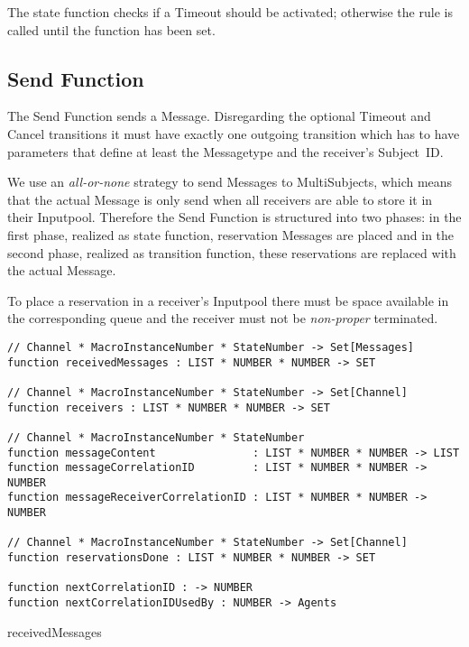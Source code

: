 The state function checks if a Timeout should be activated; otherwise the
 rule is called until the  function has
been set.




\subsection{Send Function}


The Send Function sends a Message. Disregarding the optional Timeout and Cancel
transitions it must have exactly one outgoing transition which has to have parameters that
define at least the Messagetype and the receiver's Subject~ID.

We use an \textit{all-or-none} strategy to send Messages to MultiSubjects,
which means that the actual Message is only send when all receivers are able
to store it in their Inputpool. Therefore the Send Function is structured into
two phases: in the first phase, realized as state function, reservation Messages
are placed and in the second phase, realized as transition function, these reservations
are replaced with the actual Message.

To place a reservation in a receiver's Inputpool there must be space available
in the corresponding queue and the receiver must not be
\textit{non-proper} terminated.


\begin{listing}[H]
\begin{verbatim}
// Channel * MacroInstanceNumber * StateNumber -> Set[Messages]
function receivedMessages : LIST * NUMBER * NUMBER -> SET

// Channel * MacroInstanceNumber * StateNumber -> Set[Channel]
function receivers : LIST * NUMBER * NUMBER -> SET

// Channel * MacroInstanceNumber * StateNumber
function messageContent               : LIST * NUMBER * NUMBER -> LIST
function messageCorrelationID         : LIST * NUMBER * NUMBER -> NUMBER
function messageReceiverCorrelationID : LIST * NUMBER * NUMBER -> NUMBER

// Channel * MacroInstanceNumber * StateNumber -> Set[Channel]
function reservationsDone : LIST * NUMBER * NUMBER -> SET

function nextCorrelationID : -> NUMBER
function nextCorrelationIDUsedBy : NUMBER -> Agents
\end{verbatim}
\caption{receivedMessages}
\label{lst:shortasm:receivedMessages}
\end{listing}


